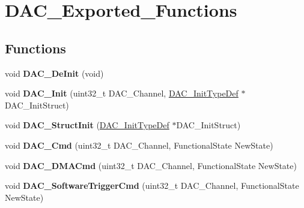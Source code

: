 \hypertarget{group__DAC__Exported__Functions}{
\section{DAC\_\-Exported\_\-Functions}
\label{group__DAC__Exported__Functions}
}
\subsection*{Functions}
\begin{DoxyCompactItemize}
\item 
\hypertarget{group__DAC__Exported__Functions_ga1fae225204e1e049d6795319e99ba8bc}{
void {\bfseries DAC\_\-DeInit} (void)}
\label{group__DAC__Exported__Functions_ga1fae225204e1e049d6795319e99ba8bc}

\item 
\hypertarget{group__DAC__Exported__Functions_ga7c59850468ed4bf0659663fe495441da}{
void {\bfseries DAC\_\-Init} (uint32\_\-t DAC\_\-Channel, \hyperlink{structDAC__InitTypeDef}{DAC\_\-InitTypeDef} $\ast$DAC\_\-InitStruct)}
\label{group__DAC__Exported__Functions_ga7c59850468ed4bf0659663fe495441da}

\item 
\hypertarget{group__DAC__Exported__Functions_gadfc270974d54cb5fa5f92556015c4046}{
void {\bfseries DAC\_\-StructInit} (\hyperlink{structDAC__InitTypeDef}{DAC\_\-InitTypeDef} $\ast$DAC\_\-InitStruct)}
\label{group__DAC__Exported__Functions_gadfc270974d54cb5fa5f92556015c4046}

\item 
\hypertarget{group__DAC__Exported__Functions_ga323e61530d7fa9396c3bce9edb61f733}{
void {\bfseries DAC\_\-Cmd} (uint32\_\-t DAC\_\-Channel, FunctionalState NewState)}
\label{group__DAC__Exported__Functions_ga323e61530d7fa9396c3bce9edb61f733}

\item 
\hypertarget{group__DAC__Exported__Functions_ga194cba38f60ace11658824f0250121f4}{
void {\bfseries DAC\_\-DMACmd} (uint32\_\-t DAC\_\-Channel, FunctionalState NewState)}
\label{group__DAC__Exported__Functions_ga194cba38f60ace11658824f0250121f4}

\item 
\hypertarget{group__DAC__Exported__Functions_ga46f9f7f6b9520a86e300fe966afe5fb3}{
void {\bfseries DAC\_\-SoftwareTriggerCmd} (uint32\_\-t DAC\_\-Channel, FunctionalState NewState)}
\label{group__DAC__Exported__Functions_ga46f9f7f6b9520a86e300fe966afe5fb3}


\end{DoxyCompactItemize}
